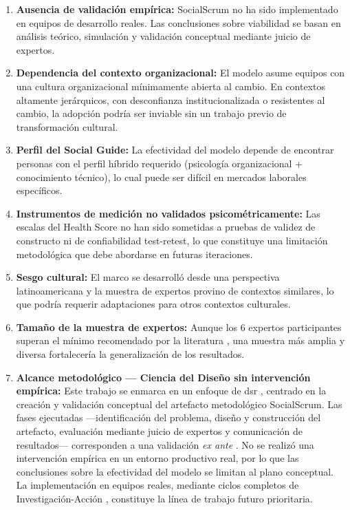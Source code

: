 \begin{enumerate}
    \item \textbf{Ausencia de validación empírica:} SocialScrum no ha sido implementado en equipos de desarrollo reales. Las conclusiones sobre viabilidad se basan en análisis teórico, simulación y validación conceptual mediante juicio de expertos.

    \item \textbf{Dependencia del contexto organizacional:} El modelo asume equipos con una cultura organizacional mínimamente abierta al cambio. En contextos altamente jerárquicos, con desconfianza institucionalizada o resistentes al cambio, la adopción podría ser inviable sin un trabajo previo de transformación cultural.

    \item \textbf{Perfil del Social Guide:} La efectividad del modelo depende de encontrar personas con el perfil híbrido requerido (psicología organizacional + conocimiento técnico), lo cual puede ser difícil en mercados laborales específicos.

    \item \textbf{Instrumentos de medición no validados psicométricamente:} Las escalas del Health Score no han sido sometidas a pruebas de validez de constructo ni de confiabilidad test-retest, lo que constituye una limitación metodológica que debe abordarse en futuras iteraciones.

    \item \textbf{Sesgo cultural:} El marco se desarrolló desde una perspectiva latinoamericana y la muestra de expertos provino de contextos similares, lo que podría requerir adaptaciones para otros contextos culturales.

    \item \textbf{Tamaño de la muestra de expertos:} Aunque los 6 expertos participantes superan el mínimo recomendado por la literatura \cite{Adillah2022}, una muestra más amplia y diversa fortalecería la generalización de los resultados.

    \item \textbf{Alcance metodológico --- Ciencia del Diseño sin intervención empírica:} Este trabajo se enmarca en un enfoque de \gls{dsr} \cite{hevner2004designscience, peffers2007dsrm}, centrado en la creación y validación conceptual del artefacto metodológico SocialScrum. Las fases ejecutadas ---identificación del problema, diseño y construcción del artefacto, evaluación mediante juicio de expertos y comunicación de resultados--- corresponden a una validación \textit{ex ante} \cite{wieringa2014dsr}. No se realizó una intervención empírica en un entorno productivo real, por lo que las conclusiones sobre la efectividad del modelo se limitan al plano conceptual. La implementación en equipos reales, mediante ciclos completos de Investigación-Acción \cite{baskerville1999actionresearch}, constituye la línea de trabajo futuro prioritaria.


\end{enumerate}
